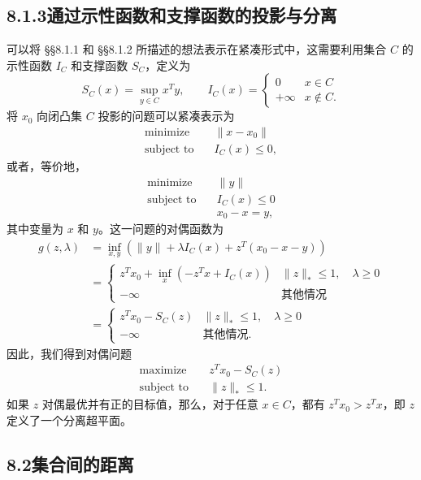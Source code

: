 \documentclass[UTF8, 12pt, fontset=fandol, oneside]{ctexart}
\begin{document}
\subsection*{8.1.3\quad 通过示性函数和支撑函数的投影与分离}

可以将 \S\S 8.1.1 和 \S\S 8.1.2 所描述的想法表示在紧凑形式中，这需要利用集合 $C$ 的示性函数 $I_C$ 和支撑函数 $S_C$，定义为
\[
S_C(x)=\sup_{y\in C}x^Ty,\qquad
I_C(x)=
\begin{cases}
0 & x\in C\\
+\infty & x\notin C.
\end{cases}
\]
将 $x_0$ 向闭凸集 $C$ 投影的问题可以紧凑表示为
\[
\begin{aligned}
\text{minimize}\quad & \|x-x_0\|\\
\text{subject to}\quad & I_C(x)\leq 0,
\end{aligned}
\]
或者，等价地，
\[
\begin{aligned}
\text{minimize}\quad & \|y\|\\
\text{subject to}\quad & I_C(x)\leq 0\\
& x_0-x=y,
\end{aligned}
\]
其中变量为 $x$ 和 $y$。这一问题的对偶函数为
\[
\begin{aligned}
g(z,\lambda)
&=\inf_{x,y}\left(\|y\|+\lambda I_C(x)+z^T(x_0-x-y)\right)\\
&=
\begin{cases}
z^Tx_0+\inf_x(-z^Tx+I_C(x)) & \|z\|_\ast\leq 1,\quad \lambda\geq 0\\
-\infty & \text{其他情况}
\end{cases}\\
&=
\begin{cases}
z^Tx_0-S_C(z) & \|z\|_\ast\leq 1,\quad \lambda\geq 0\\
-\infty & \text{其他情况}.
\end{cases}
\end{aligned}
\]
因此，我们得到对偶问题
\[
\begin{aligned}
\text{maximize}\quad & z^Tx_0-S_C(z)\\
\text{subject to}\quad & \|z\|_\ast\leq 1.
\end{aligned}
\]
如果 $z$ 对偶最优并有正的目标值，那么，对于任意 $x\in C$，都有 $z^Tx_0>z^Tx$，即 $z$ 定义了一个分离超平面。

\subsection*{8.2\quad 集合间的距离}
\end{document}
